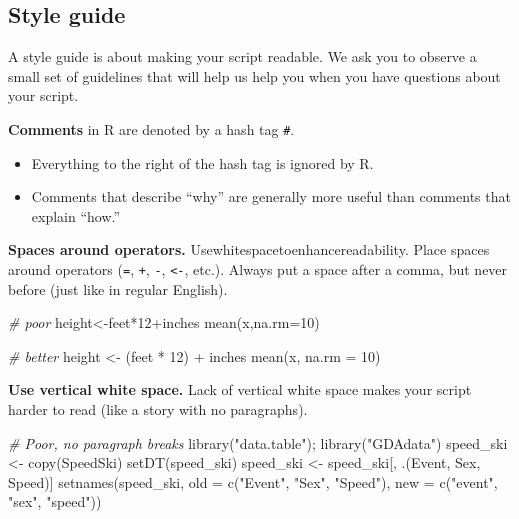 \documentclass[
]{book}
\newenvironment{Shaded}{\begin{snugshade}}{\end{snugshade}}
\newcommand{\AttributeTok}[1]{\textcolor[rgb]{0.77,0.63,0.00}{#1}}
\newcommand{\CommentTok}[1]{\textcolor[rgb]{0.56,0.35,0.01}{\textit{#1}}}
\newcommand{\DecValTok}[1]{\textcolor[rgb]{0.00,0.00,0.81}{#1}}
\newcommand{\FunctionTok}[1]{\textcolor[rgb]{0.00,0.00,0.00}{#1}}
\newcommand{\NormalTok}[1]{#1}
\newcommand{\OtherTok}[1]{\textcolor[rgb]{0.56,0.35,0.01}{#1}}
\newcommand{\SpecialCharTok}[1]{\textcolor[rgb]{0.00,0.00,0.00}{#1}}
\newcommand{\StringTok}[1]{\textcolor[rgb]{0.31,0.60,0.02}{#1}}
\providecommand{\tightlist}{%
  \setlength{\itemsep}{0pt}\setlength{\parskip}{0pt}}
\begin{document}
\hypertarget{style-guide}{%
\subsection{Style guide}\label{style-guide}}

A style guide is about making your script readable. We ask you to observe a small set of guidelines that will help us help you when you have questions about your script.

\textbf{Comments} in R are denoted by a hash tag \texttt{\#}.

\begin{itemize}
\tightlist
\item
  Everything to the right of the hash tag is ignored by R.
\item
  Comments that describe ``why'' are generally more useful than comments that explain ``how.''
\end{itemize}

\textbf{Spaces around operators.} Usewhitespacetoenhancereadability. Place spaces around operators (\texttt{=}, \texttt{+}, \texttt{-}, \texttt{\textless{}-}, etc.). Always put a space after a comma, but never before (just like in regular English).

\begin{Shaded}
\begin{Highlighting}[]
\CommentTok{\# poor}
\NormalTok{height}\OtherTok{\textless{}{-}}\NormalTok{feet}\SpecialCharTok{*}\DecValTok{12}\SpecialCharTok{+}\NormalTok{inches}
\FunctionTok{mean}\NormalTok{(x,}\AttributeTok{na.rm=}\DecValTok{10}\NormalTok{)}

\CommentTok{\# better}
\NormalTok{height }\OtherTok{\textless{}{-}}\NormalTok{ (feet }\SpecialCharTok{*} \DecValTok{12}\NormalTok{) }\SpecialCharTok{+}\NormalTok{ inches}
\FunctionTok{mean}\NormalTok{(x, }\AttributeTok{na.rm =} \DecValTok{10}\NormalTok{)}
\end{Highlighting}
\end{Shaded}

\textbf{Use vertical white space.} Lack of vertical white space makes your script harder to read (like a story with no paragraphs).

\begin{Shaded}
\begin{Highlighting}[]
\CommentTok{\# Poor, no paragraph breaks}
\FunctionTok{library}\NormalTok{(}\StringTok{"data.table"}\NormalTok{); }\FunctionTok{library}\NormalTok{(}\StringTok{"GDAdata"}\NormalTok{)}
\NormalTok{speed\_ski }\OtherTok{\textless{}{-}} \FunctionTok{copy}\NormalTok{(SpeedSki)}
\FunctionTok{setDT}\NormalTok{(speed\_ski)}
\NormalTok{speed\_ski }\OtherTok{\textless{}{-}}\NormalTok{ speed\_ski[, .(Event, Sex, Speed)]}
\FunctionTok{setnames}\NormalTok{(speed\_ski, }\AttributeTok{old =} \FunctionTok{c}\NormalTok{(}\StringTok{"Event"}\NormalTok{, }\StringTok{"Sex"}\NormalTok{, }\StringTok{"Speed"}\NormalTok{), }\AttributeTok{new =} \FunctionTok{c}\NormalTok{(}\StringTok{"event"}\NormalTok{, }\StringTok{"sex"}\NormalTok{, }\StringTok{"speed"}\NormalTok{))}
\end{Highlighting}
\end{Shaded}
\end{document}
